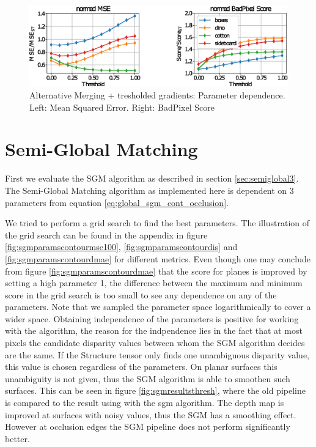 \documentclass  [
  paper    = a4,
  BCOR     = 10mm,
  twoside,
  fontsize = 12pt,
  fleqn,
  toc      = bibnumbered,
  toc      = listofnumbered,
  numbers  = noendperiod,
  headings = normal,
  listof   = leveldown,
  version  = 3.03
]                                       {scrreprt}
\begin{document}
\begin{figure}
	\centering
	\includegraphics[width=1\linewidth]{images/choose_lower_params_thresh}
	\caption[Alternative Merging: Parameter dependence]{Alternative Merging + tresholded gradients: Parameter dependence. Left: Mean Squared Error. Right: BadPixel Score}
	\label{fig:chooselowerparamsthresh}
\end{figure}






\section{Semi-Global Matching}


First we evaluate the SGM algorithm as described in section \ref{sec:semiglobal3}.
The Semi-Global Matching algorithm as implemented here is dependent on 3 parameters from equation \ref{eq:global_sgm_cont_occlusion}.

 We tried to perform a grid search to find the best parameters. The illustration of the grid search can be found in the appendix in figure \ref{fig:sgmparamscontourmse100}, \ref{fig:sgmparamscontourdis} and \ref{fig:sgmparamscontourdmae} for different metrics. Even though one may conclude from  figure \ref{fig:sgmparamscontourdmae} that the score for planes is improved by setting a high parameter 1, the difference between the maximum and minimum score in the grid search is too small to see any dependence on any of the parameters. Note that we sampled the parameter space logarithmically to cover a wider space. Obtaining independence of the parameters is positive for working with the algorithm, the reason for the indpendence lies in the fact that at most pixels the candidate disparity values between whom the SGM algorithm decides are the same. If the Structure tensor only finds one unambiguous disparity value, this value is chosen regardless of the parameters. On planar surfaces this unambiguity is not given, thus the SGM algorithm is able to smoothen such surfaces. This can be seen in figure \ref{fig:sgmresultsthresh}, where the old pipeline is compared to the result using with the sgm algorithm. The depth map is improved at surfaces with noisy values, thus the SGM has a smoothing effect. However at occlusion edges the SGM pipeline does not perform significantly better. 
\end{document}
